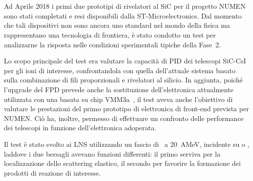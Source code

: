 \section{}

Ad Aprile 2018 i primi due prototipi di rivelatori al SiC per il progetto NUMEN sono stati completati e resi disponibili dalla ST-Microelectronics. Dal momento che tali dispositivi non sono ancora uno standard nel mondo della fisica ma rappresentano una tecnologia di frontiera, è stato condotto un test per analizzarne la risposta nelle condizioni sperimentali tipiche della Fase~2.

Lo scopo principale del test era valutare la capacità di PID dei telescopi SiC-CsI per gli ioni di interesse, confrontandola con quella dell'attuale sistema basato sulla combinazione di fili proporzionali e rivelatori al silicio.
In aggiunta, poiché l'upgrade del FPD prevede anche la sostituzione dell'elettronica attualmente utilizzata con una basata su chip VMM3a~\cite{degeronimo:ieee13}, il test aveva anche l'obiettivo di valutare le prestazioni del primo prototipo di elettronica di front-end prevista per NUMEN.
Ciò ha, inoltre, permesso di effettuare un confronto delle performance dei telescopi in funzione dell'elettronica adoperata.

Il test è stato svolto ai LNS utilizzando un fascio di~ a 20~AMeV, incidente su  o , laddove i due bersagli avevano funzioni differenti: il primo serviva per la localizzazione dello scattering elastico, il secondo per favorire la formazione dei prodotti di reazione di interesse.




